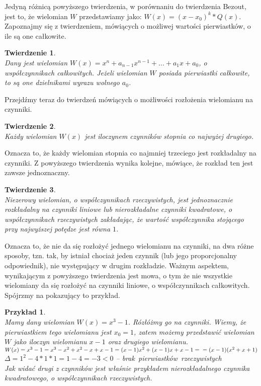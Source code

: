 \documentclass[oneside,a4paper]{book}
\newtheorem{theorem}{Twierdzenie}
\newtheorem{example}{Przykład}
\begin{document}
	Jedyną różnicą powyższego twierdzenia, w porównaniu do twierdzenia Bezout, jest to, że wielomian $W$ przedstawiamy jako: $W(x) = (x-x_0)^k * Q(x)$. Zapoznajmy się z twierdzeniem, mówiących o możliwej wartości pierwiastków, o ile są one całkowite.
	
	\begin{theorem}
		$ $\\
		Dany jest wielomian $W(x) = x^n + a_{n-1}x^{n-1} + ... + a_1x + a_0$, o współczynnikach całkowitych. Jeżeli wielomian $W$ posiada pierwiastki całkowite, to są one dzielnikami wyrazu wolnego $a_0$.
	\end{theorem}
	
	Przejdźmy teraz do twierdzeń mówiących o możliwości rozłożenia wielomianu na czynniki.
	
	\begin{theorem}
		$ $\\
		Każdy wielomian $W(x)$ jest iloczynem czynników stopnia co najwyżej drugiego.
	\end{theorem}
	
	Oznacza to, że każdy wielomian stopnia co najmniej trzeciego jest rozkładalny na czynniki. Z powyższego twierdzenia wynika kolejne, mówiące, że rozkład ten jest zawsze jednoznaczny.
	
	\begin{theorem}
		$ $\\
		Niezerowy wielomian, o współczynnikach rzeczywistych, jest jednoznacznie rozkładalny na czynniki liniowe lub nierozkładalne czynniki kwadratowe, o współczynnikach rzeczywistych zakładając, że wartość współczynnika stojącego przy najwyższej potędze jest równa $1$.
	\end{theorem}
	
	Oznacza to, że nie da się rozłożyć jednego wielomianu na czynniki, na dwa różne sposoby, tzn. tak, by istniał chociaż jeden czynnik (lub jego proporcjonalny odpowiednik), nie występujący w drugim rozkładzie. Ważnym aspektem, wynikającym z powyższego twierdzenia jest mowa, o tym że nie wszystkie wielomiany da się rozłożyć na czynniki liniowe, o współczynnikach całkowitych. Spójrzmy na pokazujący to przykład.
	
	\begin{example}
		$ $\\
		Mamy dany wielomian $W(x)=x^3-1$. Rózłóżmy go na czynniki.
		Wiemy, że pierwiastkiem tego wielomianu jest $x_0 = 1$, zatem możemy przedstawić wielomian $W$ jako iloczyn wielomianu $x-1$ oraz drugiego wielomianu. \\
		$W(x)=x^3-1=x^3-x^2+x^2-x+x-1=(x-1)x^2+(x-1)x+x-1 = \\
		=(x-1)(x^2+x+1)$ \\
		$\Delta = 1^2 - 4*1*1 = 1 - 4 = -3 < 0$ -- brak\ pierwiastków\ rzeczywistych\\
		Jak widać drugi z czynników jest właśnie przykładem nierozkładalnego czynnika kwadratowego, o współczynnikach rzeczywistych.
	\end{example}
	
\end{document}
